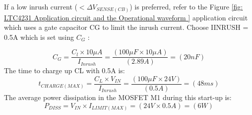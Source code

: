 If a low inrush current ($< \Delta V_{SENSE(CB)}$) is preferred, refer
to the Figure \ref{fig: LTC4231 Application circuit and the Operational waveform } application circuit which uses a gate capacitor CG to limit the inrush current. Choose IINRUSH = 0.5A
which is set using $C_G$ \cite{LTC4231_User_Datasheet}:

\begin{equation}\label{eq:LTC_Cg}
	C_{G} = \frac{ C_{l}\times 10\mu A}{I_{Inrush}} = \frac{\left(100\mu F \times 10\mu A \right)}{\left(2.89A \right)} = \left(20nF\right)
\end{equation}
The time to charge up CL with 0.5A is:
\begin{equation}\label{eq:LTC_Tcharge}
    t_{CHARGE(MAX)} = \frac{ C_{L}\times V_{IN}}{I_{Inrush}} = \frac{\left(100\mu F \times 24V \right)}{\left(0.5A \right)} = \left(48ms\right)
\end{equation}
The average power dissipation in the MOSFET M1 during this start-up is:
\begin{equation}\label{eq:LTC_Pdissp_average}
    P_{DISS} = V_{IN} \times I_{LIMIT(MAX)}  = \left(24V \times 0.5A\right) = \left(6W\right)
\end{equation}